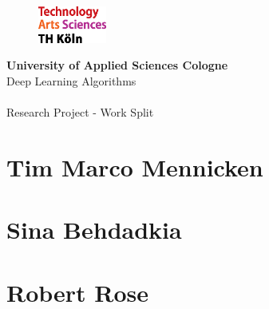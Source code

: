 \documentclass[a4paper,11pt,oneside]{article}
\begin{document}
  \pagestyle{fancy} %
  \fancyhead{}
  \fancyhf{}
  \renewcommand{\headrulewidth}{0pt}
  \renewcommand{\footrulewidth}{0.4pt}
  \fancyfoot[R] {}
  \begin{figure}
    \includegraphics[width=0.2\textwidth]{sources/logo_TH-Koeln_CMYK_22pt}
  \end{figure}
  \Large
  \textbf{University of Applied Sciences Cologne}\\
  Deep Learning Algorithms\\
  \\
  \large
  Research Project - Work Split\\

\section*{Tim Marco Mennicken}

\section*{Sina Behdadkia}

\section*{Robert Rose}
  
\end{document}
